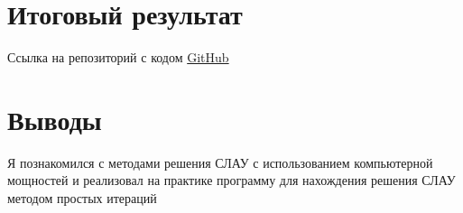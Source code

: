 \documentclass[12pt,a4paper]{report}
\begin{document}
\section*{Итоговый результат}
Ссылка на репозиторий с кодом \href{https://github.com/Armemius/ComputationalMathLab1}{GitHub}
\section*{Выводы}
Я познакомился с методами решения СЛАУ с использованием компьютерной мощностей и реализовал на практике программу для нахождения решения СЛАУ методом простых итераций
\end{document}
